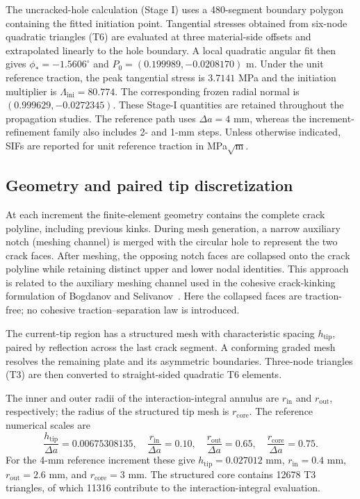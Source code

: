 \documentclass[11pt]{article}
\newcommand{\PhiStar}{-1.5606}
\newcommand{\MouthX}{0.199989}
\newcommand{\MouthY}{-0.0208170}
\newcommand{\NormalX}{0.999629}
\newcommand{\NormalY}{-0.0272345}
\newcommand{\PeakStress}{3.7141}
\newcommand{\LoadFactor}{80.774}
\begin{document}
The uncracked-hole calculation (Stage I) uses a 480-segment boundary
polygon containing the fitted initiation point. Tangential stresses
obtained from six-node quadratic triangles (T6) are evaluated at
three material-side offsets and extrapolated linearly to the hole
boundary. A local quadratic angular fit then gives
$\phi_*=\PhiStar^\circ$ and $P_0=(\MouthX,\MouthY)$ m.
Under the unit reference traction, the peak tangential stress is
$\PeakStress$ MPa and the initiation multiplier is
$\Lambda_{\mathrm{ini}}=\LoadFactor$. The corresponding frozen radial
normal is $(\NormalX,\NormalY)$. These Stage-I quantities are retained
throughout the propagation studies. The reference path uses
$\Delta a=4$ mm, whereas the increment-refinement family also
includes 2- and 1-mm steps. Unless otherwise indicated, SIFs are
reported for unit reference traction in MPa$\sqrt{\mathrm m}$.

\subsection{Geometry and paired tip discretization}
At each increment the finite-element geometry contains the complete
crack polyline, including previous kinks. During mesh generation,
a narrow auxiliary notch (meshing channel) is merged with the circular
hole to represent the two crack faces. After meshing, the opposing
notch faces are collapsed onto the crack polyline while retaining
distinct upper and lower nodal identities. This approach is related
to the auxiliary meshing channel used in the cohesive crack-kinking
formulation of Bogdanov and Selivanov~\cite{BogdanovSelivanov2026}.
Here the collapsed faces are traction-free; no cohesive
traction--separation law is introduced.

The current-tip region has a structured mesh with characteristic
spacing $h_{\mathrm{tip}}$, paired by reflection across the last
crack segment. A conforming graded mesh resolves the remaining plate
and its asymmetric boundaries. Three-node triangles (T3) are then
converted to straight-sided quadratic T6 elements.

The inner and outer radii of the interaction-integral annulus are
$r_{\mathrm{in}}$ and $r_{\mathrm{out}}$, respectively; the radius of
the structured tip mesh is $r_{\mathrm{core}}$. The reference
numerical scales are
\begin{equation}
 \frac{h_{\mathrm{tip}}}{\Delta a}=0.00675308135,\quad
 \frac{r_{\mathrm{in}}}{\Delta a}=0.10,\quad
 \frac{r_{\mathrm{out}}}{\Delta a}=0.65,\quad
 \frac{r_{\mathrm{core}}}{\Delta a}=0.75.\label{eq:meshscales}
\end{equation}
For the 4-mm reference increment these give
$h_{\mathrm{tip}}=0.027012$ mm,
$r_{\mathrm{in}}=0.4$ mm, $r_{\mathrm{out}}=2.6$ mm, and
$r_{\mathrm{core}}=3$ mm. The structured core contains 12678
T3 triangles, of which 11316 contribute to the
interaction-integral evaluation.
\end{document}
